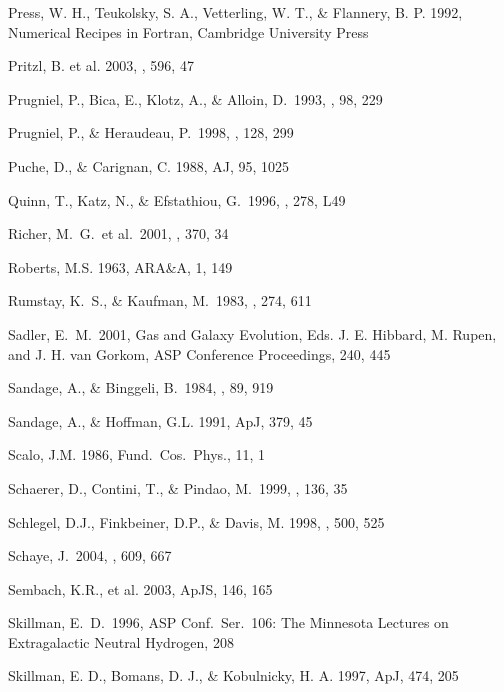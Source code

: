 \documentclass[12pt,preprint]{emulateapj}
\begin{document}
\begin{thebibliography}{}
Press, W. H., Teukolsky, S. A., Vetterling, W. T., \& Flannery, B. P. 1992,
Numerical Recipes in Fortran, Cambridge University Press

Pritzl, B. et al. 2003, \apj, 596, 47

Prugniel, P., Bica, E., Klotz, A., \& Alloin, D.\ 1993, \aaps, 98, 229 

Prugniel, P., \& Heraudeau, P.\ 1998, \aaps, 128, 299 

Puche, D., \& Carignan, C. 1988, AJ, 95, 1025

Quinn, T., Katz, N., \& Efstathiou, G.\ 1996, \mnras, 278, L49 

Richer, M.~G.~et al.\ 2001, \aap, 370, 34 

Roberts, M.S. 1963, ARA\&A, 1, 149

Rumstay, K.~S., \& Kaufman, M.\ 1983, \apj, 274, 611 

Sadler, E.~M.\ 2001, Gas and Galaxy Evolution, 
Eds. J. E. Hibbard, M. Rupen, and J. H. van Gorkom,
ASP Conference Proceedings, 240, 445 

Sandage, A., \& Binggeli, B.\ 1984, \aj, 89, 919

Sandage, A., \& Hoffman, G.L. 1991, ApJ, 379, 45

Scalo, J.M. 1986, Fund.\ Cos.\ Phys., 11, 1

Schaerer, D., Contini, T., \& Pindao, M.\ 1999, \aaps, 136, 35 

Schlegel, D.J., Finkbeiner, D.P., \& Davis, M. 1998, \apj , 500, 525

Schaye, J.\ 2004, \apj, 609, 667 

Sembach, K.R., et al. 2003, ApJS, 146, 165

Skillman, E.~D.\ 1996, ASP Conf.~Ser.~106: 
The Minnesota Lectures on Extragalactic Neutral Hydrogen, 208 

Skillman, E. D., Bomans, D. J., \& Kobulnicky, H. A.  
1997, ApJ, 474, 205


\end{thebibliography}
\end{document}

